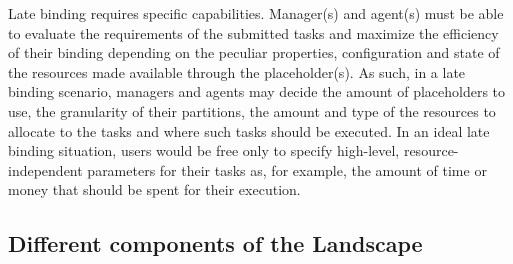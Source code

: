 \documentclass{sig-alternate}
\begin{document}
Late binding requires specific capabilities. Manager(s) and agent(s)
must be able to evaluate the requirements of the submitted tasks and
maximize the efficiency of their binding depending on the peculiar
properties, configuration and state of the resources made available
through the placeholder(s). As such, in a late binding scenario,
managers and agents may decide the amount of placeholders to use, the
granularity of their partitions, the amount and type of the resources
to allocate to the tasks and where such tasks should be executed. In
an ideal late binding situation, users would be free only to specify
high-level, resource-independent parameters for their tasks as, for
example, the amount of time or money that should be spent for their
execution. 

\subsection{Different components of the Landscape}

\end{document}
